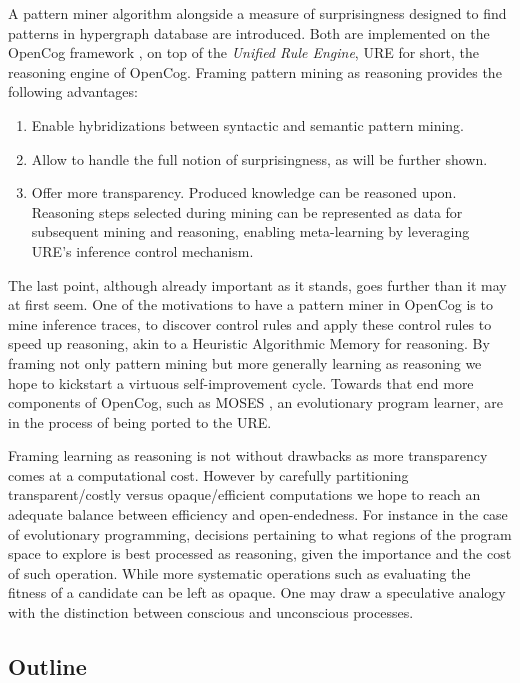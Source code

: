 \documentclass[runningheads]{llncs}
\begin{document}
A pattern miner algorithm alongside a measure of surprisingness
designed to find patterns in hypergraph database are introduced.  Both
are implemented on the OpenCog framework \cite{Goertzel2014EGI2}, on
top of the \emph{Unified Rule Engine}, URE for short, the reasoning
engine of OpenCog. Framing pattern mining as reasoning provides the
following advantages:
\begin{enumerate}
\item Enable hybridizations between syntactic and semantic pattern
  mining.
\item Allow to handle the full notion of surprisingness, as will be
  further shown.
\item Offer more transparency. Produced knowledge can be reasoned
  upon. Reasoning steps selected during mining can be represented as
  data for subsequent mining and reasoning, enabling meta-learning by
  leveraging URE's inference control mechanism.
\end{enumerate}
The last point, although already important as it stands, goes further
than it may at first seem. One of the motivations to have a pattern
miner in OpenCog is to mine inference traces, to discover control
rules and apply these control rules to speed up reasoning, akin to a
Heuristic Algorithmic Memory \cite{Ozkural2011} for reasoning. By
framing not only pattern mining but more generally learning as
reasoning we hope to kickstart a virtuous self-improvement
cycle. Towards that end more components of OpenCog, such as MOSES
\cite{Looks06abstractcompetent}, an evolutionary program learner, are
in the process of being ported to the URE.

Framing learning as reasoning is not without drawbacks as more
transparency comes at a computational cost. However by carefully
partitioning transparent/costly versus opaque/efficient computations
we hope to reach an adequate balance between efficiency and
open-endedness. For instance in the case of evolutionary programming,
decisions pertaining to what regions of the program space to explore
is best processed as reasoning, given the importance and the cost of
such operation. While more systematic operations such as evaluating
the fitness of a candidate can be left as opaque. One may draw a
speculative analogy with the distinction between conscious and
unconscious processes.

\subsection{Outline}
\end{document}

